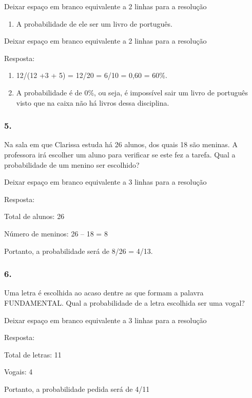 Deixar espaço em branco equivalente a 2 linhas para a resolução

\begin{enumerate}
\def\labelenumi{\alph{enumi})}
\item
  A probabilidade de ele ser um livro de português.
\end{enumerate}

Deixar espaço em branco equivalente a 2 linhas para a resolução

Resposta:

\begin{enumerate}
\def\labelenumi{\alph{enumi})}
\item
  12/(12 +3 + 5) = 12/20 = 6/10 = 0,60 = 60\%.
\item
  A probabilidade é de 0\%, ou seja, é impossível sair um livro de
  português visto que na caixa não há livros dessa disciplina.
\end{enumerate}

\subsubsection{5.}\label{section-99}

Na sala em que Clarissa estuda há 26 alunos, dos quais 18 são meninas. A
professora irá escolher um aluno para verificar se este fez a tarefa.
Qual a probabilidade de um menino ser escolhido?

Deixar espaço em branco equivalente a 3 linhas para a resolução

Resposta:

Total de alunos: 26

Número de meninos: 26 -- 18 = 8

Portanto, a probabilidade será de 8/26 = 4/13.

\subsubsection{6.}\label{section-100}

Uma letra é escolhida ao acaso dentre as que formam a palavra
FUNDAMENTAL. Qual a probabilidade de a letra escolhida ser uma vogal?

Deixar espaço em branco equivalente a 3 linhas para a resolução

Resposta:

Total de letras: 11

Vogais: 4

Portanto, a probabilidade pedida será de 4/11

